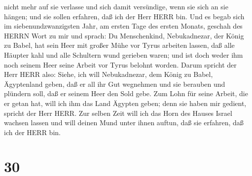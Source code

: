 nicht mehr auf sie verlasse und sich damit versündige, wenn sie sich an
sie hängen; und sie sollen erfahren, daß ich der Herr HERR bin.
 Und es begab sich im siebenundzwanzigsten Jahr, am ersten
Tage des ersten Monats, geschah des HERRN Wort zu mir und sprach:
 Du Menschenkind, Nebukadnezar, der König zu Babel, hat
sein Heer mit großer Mühe vor Tyrus arbeiten lassen, daß alle Häupter
kahl und alle Schultern wund gerieben waren; und ist doch weder ihm noch
seinem Heer seine Arbeit vor Tyrus belohnt worden.  Darum
spricht der Herr HERR also: Siehe, ich will Nebukadnezar, dem König zu
Babel, Ägyptenland geben, daß er all ihr Gut wegnehmen und sie berauben
und plündern soll, daß er seinem Heer den Sold gebe.  Zum
Lohn für seine Arbeit, die er getan hat, will ich ihm das Land Ägypten
geben; denn sie haben mir gedient, spricht der Herr HERR. 
Zur selben Zeit will ich das Horn des Hauses Israel wachsen lassen und
will deinen Mund unter ihnen auftun, daß sie erfahren, daß ich der HERR
bin.

\hypertarget{section-29}{%
\section{30}\label{section-29}}

